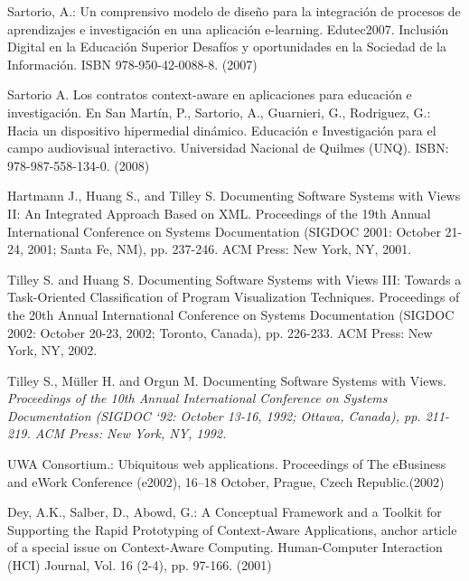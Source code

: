 \begin{thebibliography}{1}
Sartorio, A.: {Un comprensivo modelo de diseño para la integración de procesos
de aprendizajes e investigación en una aplicación e-learning. Edutec2007.
Inclusión Digital en la Educación Superior Desafíos y oportunidades en la
Sociedad de la Información. ISBN 978-950-42-0088-8. (2007)}


 Sartorio A. {Los contratos context-aware en
aplicaciones para
educación e investigación. En San Martín,  P., Sartorio, A., Guarnieri, G.,
Rodriguez, G.: Hacia un dispositivo hipermedial dinámico. Educación e
Investigación para el campo audiovisual interactivo. Universidad Nacional de
Quilmes (UNQ). ISBN: 978-987-558-134-0. (2008)}


 Hartmann J., Huang S., and Tilley S. {Documenting Software Systems
with Views II: An Integrated Approach  Based on XML.} Proceedings of the 19th
Annual  International Conference on Systems Documentation  (SIGDOC 2001: October
21-24, 2001; Santa Fe, NM), pp.  237-246. ACM Press: New York, NY, 2001.

 Tilley S. and Huang S. {Documenting Software Systems  with Views
III: Towards a Task-Oriented Classification of  Program Visualization
Techniques.} Proceedings of the 20th  Annual International Conference on Systems
Documentation  (SIGDOC 2002: October 20-23, 2002; Toronto, Canada), pp. 
226-233. ACM Press: New York, NY, 2002.

 Tilley S., Müller H. and Orgun M. {Documenting  Software Systems
with Views.} \textit{Proceedings of the 10th  Annual International Conference on
Systems Documentation  (SIGDOC ‘92: October 13-16, 1992; Ottawa, Canada), pp. 
211-219. ACM Press: New York, NY, 1992.}

UWA Consortium.: {Ubiquitous web applications. Proceedings of The eBusiness
and eWork Conference (e2002), 16–18 October, Prague, Czech Republic.(2002)}

Dey, A.K., Salber, D., Abowd, G.: {A Conceptual Framework and a Toolkit for
Supporting the Rapid Prototyping of Context-Aware Applications, anchor article
of a special issue on Context-Aware Computing. Human-Computer Interaction (HCI)
Journal, Vol. 16 (2-4), pp. 97-166. (2001)}



\end{thebibliography}
